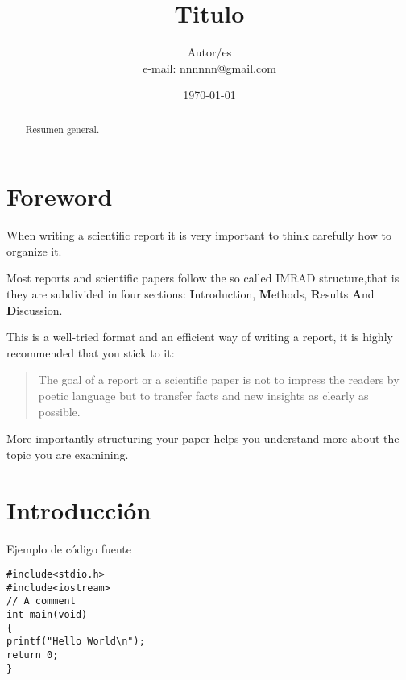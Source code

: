 \documentclass[a4paper,10pt]{article}
\begin{document}
\title{Titulo}
\author{Autor/es \\ e-mail: nnnnnn@gmail.com}
\date{\today}
\maketitle

\begin{abstract}
	Resumen general.
\end{abstract}

\section*{Foreword}
When writing a scientific report it is very important to think carefully how to organize it.

Most reports and scientific papers follow the so called IMRAD structure,that is they are subdivided in four sections: \textbf{I}ntroduction, \textbf{M}ethods, \textbf{R}esults \textbf{A}nd \textbf{D}iscussion.

This is a well-tried format and an efficient way of writing a report, it is highly recommended that you stick to it: 

\begin{quote}
	The goal of a report or a scientific paper is not to impress the readers by poetic language but to transfer facts and new insights as clearly as possible.
\end{quote}

More importantly structuring your paper helps you understand more about the topic you are examining.

\section{Introducción}

\large{Ejemplo de código fuente}

\begin{lstlisting}[title={Prueba de titulo},caption={Prueba de caption},captionpos=b,frame=shadowbox]
#include<stdio.h>
#include<iostream>
// A comment
int main(void)
{
printf("Hello World\n");
return 0;
}
\end{lstlisting}
\end{document}

